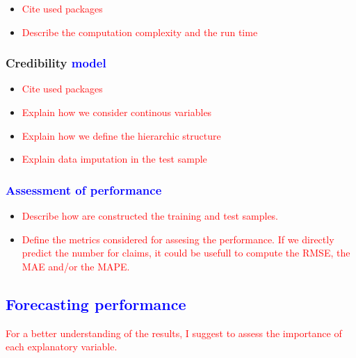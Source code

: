 \documentclass[
]{article}
\providecommand{\tightlist}{%
  \setlength{\itemsep}{0pt}\setlength{\parskip}{0pt}}
\begin{document}
\begin{itemize}
\tightlist
\item
  \textcolor{red}{Cite used packages}
\item
  \textcolor{red}{Describe the computation complexity and the run time}
\end{itemize}

\hypertarget{credibility}{%
\subsubsection{\texorpdfstring{Credibility
\textcolor{blue}{model}}{Credibility }}\label{credibility}}

\begin{itemize}
\tightlist
\item
  \textcolor{red}{Cite used packages}
\item
  \textcolor{red}{Explain how we consider continous variables}
\item
  \textcolor{red}{Explain how we define the hierarchic structure}
\item
  \textcolor{red}{Explain data imputation in the test sample}
\end{itemize}

\hypertarget{section-1}{%
\subsubsection{\texorpdfstring{\textcolor{blue}{Assessment of performance}}{}}\label{section-1}}

\begin{itemize}
\tightlist
\item
  \textcolor{red}{Describe how are constructed the training and test samples.}
\item
  \textcolor{red}{Define the metrics considered for assesing the performance. If we directly predict the number for claims, it could be usefull to compute the RMSE, the MAE and/or the MAPE.}
\end{itemize}

\hypertarget{section-2}{%
\subsection{\texorpdfstring{\textcolor{blue}{Forecasting performance}}{}}\label{section-2}}

\textcolor{red}{For a better understanding of the results, I suggest to assess the importance of each explanatory variable.}
\end{document}
